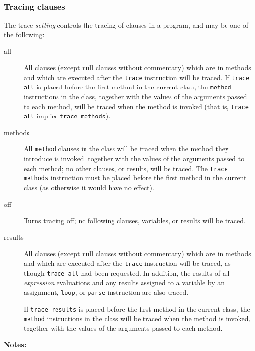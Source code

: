 \subsubsection{Tracing clauses}
 
The trace \emph{setting} controls the tracing of clauses in a program, and
may be one of the following:
\begin{description}
\item[all]\label{reftrall}
 All clauses (except null clauses without commentary) which are in
methods and which are executed after the \texttt{trace} instruction will
be traced.
If \texttt{trace all} is placed before the first method in the current
class, the \texttt{method} instructions in the class,
together with the values of the arguments passed to each method,
will be traced when the method is invoked (that is, \texttt{trace all}
implies \texttt{trace methods}).
\item[methods]\label{reftrmeth}
 
All \texttt{method} clauses in the class will be traced when the method
they introduce is invoked, together with the values of the arguments
passed to each method; no other clauses, or results, will be traced.
The \texttt{trace methods} instruction must be placed before the first
method in the current class (as otherwise it would have no effect).
\item[off]\label{reftroff}
 
Turns tracing off; no following clauses, variables, or results will be traced.
\item[results]\label{reftrres}
 All clauses (except null clauses without commentary) which are in
methods and which are executed after the \texttt{trace} instruction will
be traced, as though \texttt{trace all} had been requested.
In addition, the results of all \emph{expression} evaluations and
any results assigned to a variable by an assignment, \texttt{loop}, or
\texttt{parse} instruction are also traced.
 
If \texttt{trace results} is placed before the first method in the
current class, the \texttt{method} instructions in the class will be
traced when the method is invoked, together with the values of the
arguments passed to each method.
\end{description}
 \textbf{Notes:}
